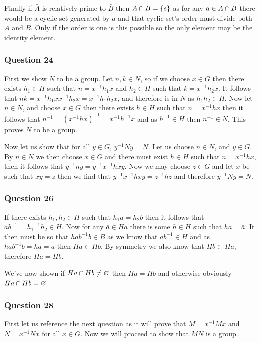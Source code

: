 \documentclass{article}
\begin{document}
Finally if $\bar A$ is relatively prime  to $\bar B$ then $A \cap B = \left\{ {e} \right\}$ as for any $a \in A \cap B$ there would be a cyclic set generated by $a$ and that cyclic set's order must divide both $A$ and $B$. Only if the order is one is this possible so the only element may be the identity element.

\subsubsection{Question 24}

First we show $N$ to be a group. Let $n,k \in N$, so if we choose $x \in G$ then there exists $h_1\in H$ such that $n=x^{-1}h_1x$ and $h_2 \in H$ such that $k=x^{-1}h_2x$. It follows that $nk= x^{-1}h_1xx^{-1}h_2x = x^{-1}h_1h_2x$, and therefore is in $N$ as $h_1h_2 \in H$. Now let $n \in N$, and choose $x\in G$ then there exists $h\in H$ such that $n = x^{-1}hx$ then it follows that $n^{-1} = \left(x^{-1}hx\right)^{-1} = x^{-1}h^{-1}x$ and as $h^{-1} \in H$ then $n^{-1} \in N$. This proves $N$ to be a group.

Now let us show that for all $y \in G$, $y^{-1}Ny = N$. Let us choose $n \in N$, and $y \in G$. By $n \in N$ we then choose $x \in G$ and there must exist $h \in H$ such that $n=x^{-1}hx$, then it follows that $y^{-1}ny= y^{-1}x^{-1}hxy$. Now we may choose $z \in G$ and let $x$ be such that $xy = z$ then we find that $y^{-1}x^{-1}hxy = z^{-1}hz$ and therefore $y^{-1}Ny=N$.

\subsubsection{Question 26}

If there exists $h_1, h_2 \in H$ such that $h_1a = h_2b$ then it follows that $ab^{-1} = {h_1}^{-1}h_2 \in H$. Now for any $\bar a \in Ha$ there is some $h \in H$ such that $ha = \bar a$. It then must be so that $hab^{-1}b \in B$ as we know that $ab^{-1} \in H$ and as $hab^{-1}b = ha = \bar a$ then $Ha \subset Hb$. By symmetry we also know that $Hb \subset Ha$, therefore $Ha = Hb$.

We've now shown if $Ha \cap Hb \not= \varnothing$ then $Ha = Hb$ and otherwise obviously $Ha \cap Hb = \varnothing$.

\subsubsection{Question 28}

First let us reference the next question as it will prove that $M = x^{-1}Mx$ and $N = x^{-1}Nx$ for all $x\in G$. Now we will proceed to show that $MN$ is a group.
\end{document}
